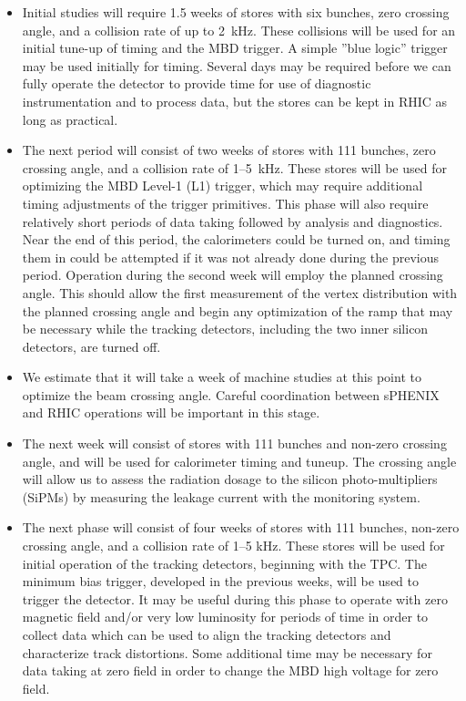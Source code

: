 \begin{itemize}

\item Initial studies will require 1.5 weeks of stores with six
  bunches, zero crossing angle, and a collision rate of up to 2~kHz.
  These collisions will be used for an initial tune-up of timing and
  the MBD trigger.  A simple ''blue logic'' trigger may be used
  initially for timing.  Several days may be required before we can
  fully operate the detector to provide time for use of diagnostic
  instrumentation and to process data, but the stores can be kept in
  RHIC as long as practical.

\item The next period will consist of two weeks of stores with 111
  bunches, zero crossing angle, and a collision rate of 1--5~kHz.
  These stores will be used for optimizing the MBD Level-1 (L1)
  trigger, which may require additional timing adjustments of the
  trigger primitives.  This phase will also require relatively short
  periods of data taking followed by analysis and diagnostics.  Near
  the end of this period, the calorimeters could be turned on, and
  timing them in could be attempted if it was not already done during
  the previous period.  Operation during the second week will employ
  the planned crossing angle.  This should allow the first measurement
  of the vertex distribution with the planned crossing angle and
  begin any optimization of the ramp that may be necessary while the
  tracking detectors, including the two inner silicon detectors, are
  turned off.

\item We estimate that it will take a week of machine studies at this
  point to optimize the beam crossing angle.  Careful coordination
  between sPHENIX and RHIC operations will be important in this stage.

\item The next week will consist of stores with 111 bunches and
  non-zero crossing angle, and will be used for calorimeter timing and
  tuneup.  The crossing angle will allow us to assess the radiation
  dosage to the silicon photo-multipliers (SiPMs) by measuring the
  leakage current with the monitoring system.

\item The next phase will consist of four weeks of stores with 111
  bunches, non-zero crossing angle, and a collision rate of 1--5 kHz.
  These stores will be used for initial operation of the tracking
  detectors, beginning with the TPC.  The minimum bias trigger,
  developed in the previous weeks, will be used to trigger the
  detector.  It may be useful during this phase to operate with zero
  magnetic field and/or very low luminosity for periods of time in
  order to collect data which can be used to align the tracking
  detectors and characterize track distortions.  Some additional time
  may be necessary for data taking at zero field in order to change
  the MBD high voltage for zero field.


\end{itemize}
